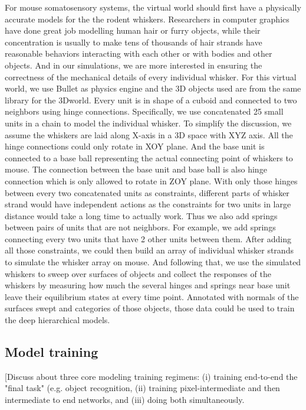 \documentclass[12pt]{article}
\begin{document}
For mouse somatosensory systems, the virtual world should first have a physically accurate models for the the rodent whiskers.
Researchers in computer graphics have done great job modelling human hair or furry objects\cite{Hadap2008, Ward2007}, while their concentration is usually to make tens of thousands of hair strands have reasonable behaviors interacting with each other or with bodies and other objects.
And in our simulations, we are more interested in ensuring the correctness of the mechanical details of every individual whisker. For this virtual world, we use Bullet \cite{wiki:bullet} as physics engine and the 3D objects used are from the same library for the 3Dworld. Every unit is in shape of a cuboid and connected to two neighbors using hinge connections.
Specifically, we use concatenated 25 small units in a chain to model the individual whisker.
To simplify the discussion, we assume the whiskers are laid along X-axis in a 3D space with XYZ axis. All the hinge connections could only rotate in XOY plane. And the base unit is connected to a base ball representing the actual connecting point of whiskers to mouse. The connection between the base unit and base ball is also hinge connection which is only allowed to rotate in ZOY plane.
With only those hinges between every two concatenated units as constraints, different parts of whisker strand would have independent actions as the constraints for two units in large distance would take a long time to actually work. Thus we also add springs between pairs of units that are not neighbors. For example, we add springs connecting every two units that have 2 other units between them.
After adding all those constraints, we could then build an array of individual whisker strands to simulate the whisker array on mouse. And following that, we use the simulated whiskers to sweep over surfaces of objects and collect the responses of the whiskers by measuring how much the several hinges and springs near base unit leave their equilibrium states at every time point. Annotated with normals of the surfaces swept and categories of those objects, those data could be used to train the deep hierarchical models.

\subsection*{Model training}

[Discuss about three core modeling training regimens:  (i) training end-to-end the "final task" (e.g. object recognition, (ii) training pixel-intermediate and then intermediate to end networks, and (iii) doing both simultaneously.
\end{document}
